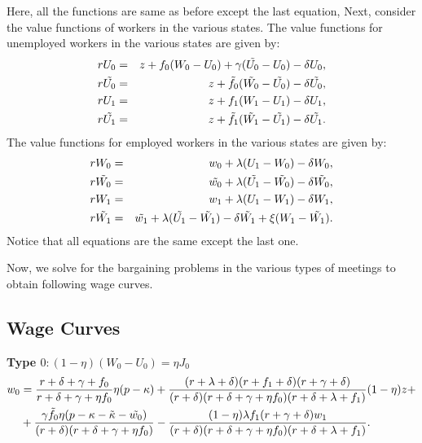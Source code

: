 \documentclass[12pt]{article} %
\theoremstyle{definition}
\begin{document}
Here, all the functions are same as before except the last equation, 
Next, consider the value functions of workers in the various states. The value functions for unemployed workers in the various states are given by: 
\begin{eqnarray}
    rU_0 &=& z+f_0(W_0-U_0)+\gamma(\Tilde{U_0}-U_0) - \delta U_0, \label{eq U0} \\
    r\Tilde{U_0} &=& z+\Tilde{f_0}(\Tilde{W_0}-\Tilde{U_0})- \delta \Tilde{U_0}, \label{eq U0 tilde}\\
    rU_1 &=& z+f_1(W_1-U_1)- \delta U_1, \label{eq U1}\\
    r\Tilde{U_1} &=& z+\Tilde{f_1}(\Tilde{W_1}-\Tilde{U_1})- \delta \Tilde{U_1}. \label{eq U1 tilde} 
\end{eqnarray}
The value functions for employed workers in the various states are given by: 
\begin{eqnarray}
    rW_0 &=&w_0+\lambda(U_1-W_0)- \delta W_0, \label{eq W0} \\
     r\Tilde{W_0} &=& \Tilde{w_0}+\lambda(\Tilde{U_1}-\Tilde{W_0})- \delta \Tilde{W_0}, \label{eq W0 tilde} \\
     rW_1 &=& w_1+\lambda(U_1-W_1)- \delta W_1, \label{eq W1} \\
     r\Tilde{W_1} &=& \Tilde{w_1}+\lambda(\Tilde{U_1}-\Tilde{W_1})- \delta \Tilde{W_1} + \xi(W_1-\tilde{W_1}). \label{eq W1 tilde}
     \end{eqnarray}
Notice that all equations are the same except the last one. 

Now, we solve for the bargaining problems in the various types of meetings to obtain following wage curves. 

\subsection*{Wage Curves}\label{regain wage curves} 
\textbf{Type $0: (1-\eta)(W_0-U_0) = \eta J_0$}
\begin{equation}\label{eq WC0}
 \begin{split}
         w_0 & = \frac{r+\delta+\gamma +f_0}{r+\delta+\gamma+\eta f_0}\eta (p-\kappa) + \frac{(r+\lambda+\delta)(r+f_1+\delta)(r+\gamma+\delta)}{(r+\delta)(r+\delta+\gamma + \eta f_0)(r+\delta+\lambda+f_1)} (1-\eta) z + \\  
 & + \frac{\gamma \Tilde{f_0}\eta(p-\kappa-\Tilde{\kappa}-\Tilde{w_0})}{(r+\delta)(r+\delta+\gamma + \eta f_0)} - \frac{(1-\eta)\lambda f_1 (r+\gamma+\delta)w_1}{(r+\delta)(r+\delta+\gamma + \eta f_0)(r+\delta+\lambda+f_1)}. 
    \end{split}
\end{equation}
\end{document}
